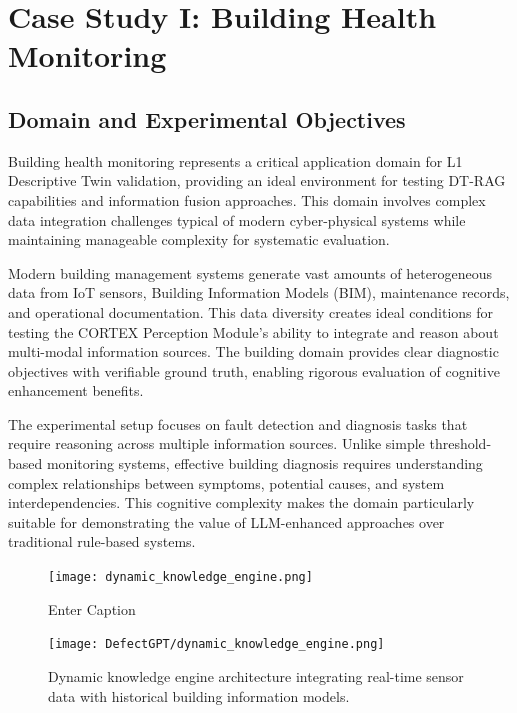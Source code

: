 
\chapter{Case Study I: Building Health Monitoring} \label{chp:building}

\section{Domain and Experimental Objectives}

Building health monitoring represents a critical application domain for L1 Descriptive Twin validation, providing an ideal environment for testing DT-RAG capabilities and information fusion approaches. This domain involves complex data integration challenges typical of modern cyber-physical systems while maintaining manageable complexity for systematic evaluation.

Modern building management systems generate vast amounts of heterogeneous data from IoT sensors, Building Information Models (BIM), maintenance records, and operational documentation. This data diversity creates ideal conditions for testing the CORTEX Perception Module's ability to integrate and reason about multi-modal information sources. The building domain provides clear diagnostic objectives with verifiable ground truth, enabling rigorous evaluation of cognitive enhancement benefits.

The experimental setup focuses on fault detection and diagnosis tasks that require reasoning across multiple information sources. Unlike simple threshold-based monitoring systems, effective building diagnosis requires understanding complex relationships between symptoms, potential causes, and system interdependencies. This cognitive complexity makes the domain particularly suitable for demonstrating the value of LLM-enhanced approaches over traditional rule-based systems.
\begin{figure}
    \centering
    \texttt{[image: dynamic\_knowledge\_engine.png]}
    \caption{Enter Caption}
    \label{fig:enter-label}
\end{figure}
\begin{figure}[htbp]
\centering
\texttt{[image: DefectGPT/dynamic\_knowledge\_engine.png]}
\caption{Dynamic knowledge engine architecture integrating real-time sensor data with historical building information models.}
\label{fig:dynamic_knowledge_engine}
\end{figure}

